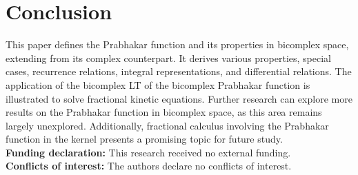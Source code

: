 \documentclass[a4paper,12pt]{article}
\theoremstyle{remark}
\begin{document}
\section{Conclusion}
This paper defines the Prabhakar function and its properties in bicomplex space, extending from its complex counterpart. It derives various properties, special cases, recurrence relations, integral representations, and differential relations. The application of the bicomplex LT of the bicomplex Prabhakar function is illustrated to solve fractional kinetic equations. Further research can explore more results on the Prabhakar function in bicomplex space, as this area remains largely unexplored. Additionally, fractional calculus involving the Prabhakar function in the kernel presents a promising topic for future study.
\\
	
\textbf{Funding declaration:} {This research received no external funding.}\\
	
	
	
	

	
\textbf{Conflicts of interest:} The authors declare no conflicts of {interest}.\\


\end{document}
